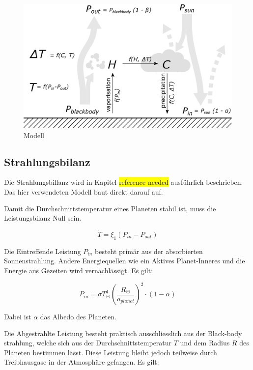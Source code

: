 \begin{refsection}
\begin{figure}
	\centering
	\includegraphics[width=\textwidth]{planeten/Pictures/Model.eps}
	\caption{Modell}
\end{figure}

\subsection{Strahlungsbilanz}

Die Strahlungsbillanz wird in Kapitel \hl{reference needed} ausführlich beschrieben. Das hier verwendeten Modell baut direkt darauf auf.

Damit die Durchschnittstemperatur eines Planeten stabil ist, muss die Leistungsbilanz Null sein.

\begin{equation}
\dot{T} = \xi_1(P_{in} - P_{out})
\end{equation}

Die Eintreffende Leistung $P_{in}$ besteht primär aus der absorbierten Sonnenstrahlung. Andere Energiequellen wie ein Aktives Planet-Inneres und die Energie aus Gezeiten wird vernachlässigt. Es gilt:

\begin{equation}
P_{in} = \sigma T_{\astrosun}^4 \left( \frac{R_{\astrosun}}{a_{planet}} \right) ^2 \cdot (1-\alpha)
\end{equation}

Dabei ist $\alpha$ das Albedo des Planeten.

Die Abgestrahlte Leistung besteht praktisch ausschliesslich aus der Black-body strahlung, welche sich aus der Durchschnittstemperatur $T$ und dem Radius $R$ des Planeten bestimmen lässt. Diese Leistung bleibt jedoch teilweise durch Treibhausgase in der Atmosphäre gefangen. Es gilt: 


\end{refsection}
